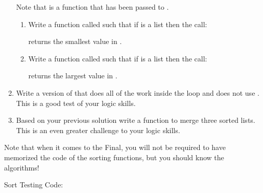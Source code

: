 \documentclass[letterpaper,10pt,english]{sphinxmanual}
\begin{document}
\begin{enumerate}
Note that  is a function that has been passed to .
\begin{enumerate}
\def\theenumii{\arabic{enumii}}
\def\labelenumii{\theenumii .}
\makeatletter\def\p@enumiii{\p@enumii \theenumii .}\makeatother
\item {} 
Write a function called  such that if 
is a list then the call:

\begin{sphinxVerbatim}[commandchars=\\\{\}]
 
\end{sphinxVerbatim}

returns the smallest value in .

\item {} 
Write a function called  such that if 
is a list then the call:

\begin{sphinxVerbatim}[commandchars=\\\{\}]
 
\end{sphinxVerbatim}

returns the largest value in .

\end{enumerate}

\item {} 
Write a version of  that does all of the work inside the
 loop and does not use . This is a good test
of your logic skills.

\item {} 
Based on your previous solution write a function to merge three
sorted lists. This is an even greater challenge to your logic skills.

\end{enumerate}

Note that when it comes to the Final, you will not be required to have
memorized the code of the sorting functions, but you should know the
algorithms!

Sort Testing Code:
\end{document}
